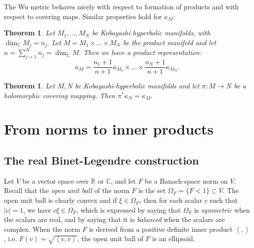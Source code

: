 \documentclass[a4paper,11pt,reqno]{amsart}
\theoremstyle{plain}
\newtheorem{theorem}[equation]{Theorem}
\theoremstyle{definition}
\theoremstyle{remark}
\theoremstyle{remark}
\numberwithin{equation}{section}
\newcommand{\abs}[1]{\left\vert#1\right\vert}
\newcommand{\ipr}[1]{\left\langle #1 \right\rangle}
\newcommand{\cx}{{\mathbb C}}
\newcommand{\rl}{\mathbb R}
\begin{document}
The Wu metric behaves nicely with respect to formation of products and with respect to covering maps. Similar properties hold for $\kappa_M$:

\begin{theorem}
    \label{thm-product}
    Let $M_1,\dots, M_N$ be Kobayashi hyperbolic manifolds, with 
    $\dim_\cx M_j=n_j.$ Let $M=M_1\times  \dots \times M_N$ be the product manifold and let $n= \sum_{j=1}^N n_j =\dim_\cx M.$
    Then we have a product representation:
    \[ \kappa_M = \frac{n_1+1}{n+1}\kappa_{M_1}\times \dots \times \frac{n_N+1}{n+1}\kappa_{M_{N}}. \]
\end{theorem}

\begin{theorem} \label{thm-covering}
Let $M,N$ be Kobayashi-hyperbolic manifolds and let $\pi:M\to N$
be a holomorphic covering mapping. Then $\pi^*\kappa_N=\kappa_M.$
    
\end{theorem}





\section{From norms to inner products}
\subsection{The real Binet-Legendre construction}
Let $V$ be a vector space over $\rl$ or $\cx$, and let $F$ be a Banach-space norm 
on $V$. 
Recall that the \emph{open unit ball} of the norm $F$ is the set 
$\Omega_F=\{F<1\}\subset V$. The open unit ball is clearly convex and if $\xi \in \Omega_F$, then for each scalar $c$ such that $\abs{c}=1$, we have $c\xi \in \Omega_F$, which is expressed by saying that 
$\Omega_F$ is \emph{symmetric} when the scalars are real, and by saying that it is \emph{balanced} when the scalars are complex.
When the norm $ F $ is derived from a positive definite inner product $\ipr{,}$, i.e. $F(v)= \sqrt{\ipr{v,v}}$, the open unit ball of $F$ is an ellipsoid. 
\end{document}
